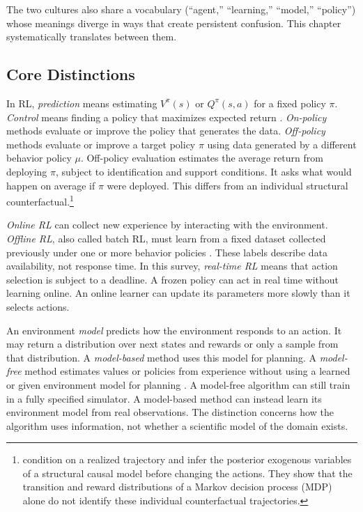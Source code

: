 The two cultures also share a vocabulary (``agent,'' ``learning,'' ``model,'' ``policy'') whose meanings diverge in ways that create persistent confusion. This chapter systematically translates between them.

\subsection{Core Distinctions}
\label{subsec:core_distinctions}

In RL, \emph{prediction} means estimating $V^\pi(s)$ or $Q^\pi(s,a)$ for a fixed policy $\pi$. \emph{Control} means finding a policy that maximizes expected return \citep{sutton2018}. \emph{On-policy} methods evaluate or improve the policy that generates the data. \emph{Off-policy} methods evaluate or improve a target policy $\pi$ using data generated by a different behavior policy $\mu$. Off-policy evaluation estimates the average return from deploying $\pi$, subject to identification and support conditions. It asks what would happen on average if $\pi$ were deployed. This differs from an individual structural counterfactual.\footnote{\citet{oberst2019counterfactual} condition on a realized trajectory and infer the posterior exogenous variables of a structural causal model before changing the actions. They show that the transition and reward distributions of a Markov decision process (MDP) alone do not identify these individual counterfactual trajectories.}

\emph{Online RL} can collect new experience by interacting with the environment. \emph{Offline RL}, also called batch RL, must learn from a fixed dataset collected previously under one or more behavior policies \citep{Levine2020}. These labels describe data availability, not response time. In this survey, \emph{real-time RL} means that action selection is subject to a deadline. A frozen policy can act in real time without learning online. An online learner can update its parameters more slowly than it selects actions.

An environment \emph{model} predicts how the environment responds to an action. It may return a distribution over next states and rewards or only a sample from that distribution. A \emph{model-based} method uses this model for planning. A \emph{model-free} method estimates values or policies from experience without using a learned or given environment model for planning \citep{sutton2018}. A model-free algorithm can still train in a fully specified simulator. A model-based method can instead learn its environment model from real observations. The distinction concerns how the algorithm uses information, not whether a scientific model of the domain exists.

